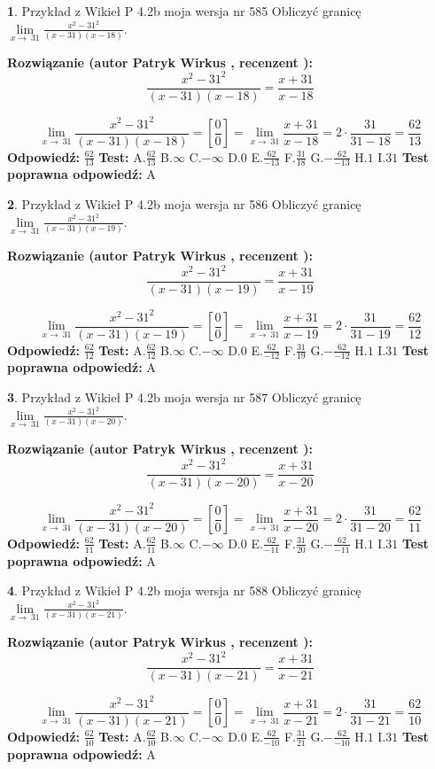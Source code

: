 \documentclass[12pt, a4paper]{article}
\theoremstyle{definition} %
\newtheorem{zad}{}
\newcommand{\zadStart}[1]{\begin{zad}#1\newline}
\newcommand{\zadStop}{\end{zad}}
\newcommand{\rozwStart}[2]{\noindent \textbf{Rozwiązanie (autor #1 , recenzent #2): }\newline}
\newcommand{\rozwStop}{\newline}
\newcommand{\odpStart}{\noindent \textbf{Odpowiedź:}\newline}
\newcommand{\odpStop}{\newline}
\newcommand{\testStart}{\noindent \textbf{Test:}\newline}
\newcommand{\testStop}{\newline}
\newcommand{\kluczStart}{\noindent \textbf{Test poprawna odpowiedź:}\newline}
\newcommand{\kluczStop}{\newline}
\begin{document}
\zadStart{Przykład z Wikieł P 4.2b moja wersja nr 585}
Obliczyć granicę $\lim\limits_{x\to\ 31}\frac{x^{2}-31^{2}}{(x-31)(x-18)}$.
\zadStop
\rozwStart{Patryk Wirkus}{}
$$\frac{x^{2}-31^{2}}{(x-31)(x-18)}=\frac{x+31}{x-18}$$

$$\lim\limits_{x\to\ 31}\frac{x^{2}-31^{2}}{(x-31)(x-18)}=[\frac{0}{0}]=\lim\limits_{x\to\ 31}\frac{x+31}{x-18}=2 \cdot \frac{31}{31-18} = \frac{62}{13}$$
\rozwStop
\odpStart
$\frac{62}{13}$
\odpStop
\testStart
A.$\frac{62}{13}$
B.$\infty$
C.$-\infty$
D.$0$
E.$\frac{62}{-13}$
F.$\frac{31}{18}$
G.$-\frac{62}{-13}$
H.$1$
I.$31$
\testStop
\kluczStart
A
\kluczStop



\zadStart{Przykład z Wikieł P 4.2b moja wersja nr 586}
Obliczyć granicę $\lim\limits_{x\to\ 31}\frac{x^{2}-31^{2}}{(x-31)(x-19)}$.
\zadStop
\rozwStart{Patryk Wirkus}{}
$$\frac{x^{2}-31^{2}}{(x-31)(x-19)}=\frac{x+31}{x-19}$$

$$\lim\limits_{x\to\ 31}\frac{x^{2}-31^{2}}{(x-31)(x-19)}=[\frac{0}{0}]=\lim\limits_{x\to\ 31}\frac{x+31}{x-19}=2 \cdot \frac{31}{31-19} = \frac{62}{12}$$
\rozwStop
\odpStart
$\frac{62}{12}$
\odpStop
\testStart
A.$\frac{62}{12}$
B.$\infty$
C.$-\infty$
D.$0$
E.$\frac{62}{-12}$
F.$\frac{31}{19}$
G.$-\frac{62}{-12}$
H.$1$
I.$31$
\testStop
\kluczStart
A
\kluczStop



\zadStart{Przykład z Wikieł P 4.2b moja wersja nr 587}
Obliczyć granicę $\lim\limits_{x\to\ 31}\frac{x^{2}-31^{2}}{(x-31)(x-20)}$.
\zadStop
\rozwStart{Patryk Wirkus}{}
$$\frac{x^{2}-31^{2}}{(x-31)(x-20)}=\frac{x+31}{x-20}$$

$$\lim\limits_{x\to\ 31}\frac{x^{2}-31^{2}}{(x-31)(x-20)}=[\frac{0}{0}]=\lim\limits_{x\to\ 31}\frac{x+31}{x-20}=2 \cdot \frac{31}{31-20} = \frac{62}{11}$$
\rozwStop
\odpStart
$\frac{62}{11}$
\odpStop
\testStart
A.$\frac{62}{11}$
B.$\infty$
C.$-\infty$
D.$0$
E.$\frac{62}{-11}$
F.$\frac{31}{20}$
G.$-\frac{62}{-11}$
H.$1$
I.$31$
\testStop
\kluczStart
A
\kluczStop



\zadStart{Przykład z Wikieł P 4.2b moja wersja nr 588}
Obliczyć granicę $\lim\limits_{x\to\ 31}\frac{x^{2}-31^{2}}{(x-31)(x-21)}$.
\zadStop
\rozwStart{Patryk Wirkus}{}
$$\frac{x^{2}-31^{2}}{(x-31)(x-21)}=\frac{x+31}{x-21}$$

$$\lim\limits_{x\to\ 31}\frac{x^{2}-31^{2}}{(x-31)(x-21)}=[\frac{0}{0}]=\lim\limits_{x\to\ 31}\frac{x+31}{x-21}=2 \cdot \frac{31}{31-21} = \frac{62}{10}$$
\rozwStop
\odpStart
$\frac{62}{10}$
\odpStop
\testStart
A.$\frac{62}{10}$
B.$\infty$
C.$-\infty$
D.$0$
E.$\frac{62}{-10}$
F.$\frac{31}{21}$
G.$-\frac{62}{-10}$
H.$1$
I.$31$
\testStop
\kluczStart
A
\kluczStop
\end{document}
